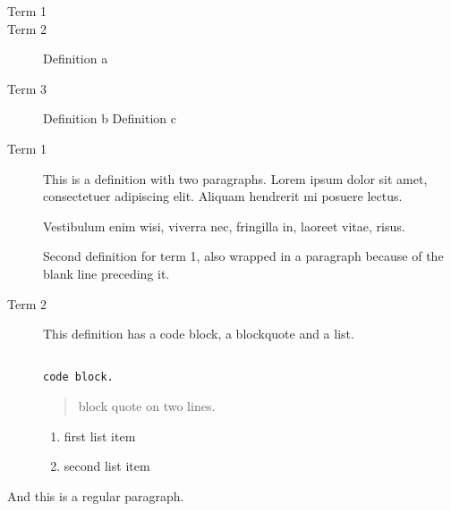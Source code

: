 
\def\mytitle{MultiMarkdown Definition List Test  }

\begin{description}
\item[Term 1
] \item[Term 2
] Definition a\item[Term 3
] 
Definition b
Definition c\item[Term 1
] 

This is a definition with two paragraphs. Lorem ipsum
 dolor sit amet, consectetuer adipiscing elit. Aliquam
 hendrerit mi posuere lectus.

Vestibulum enim wisi, viverra nec, fringilla in, laoreet
vitae, risus.

Second definition for term 1, also wrapped in a paragraph
 because of the blank line preceding it.\item[Term 2
] 

This definition has a code block, a blockquote and a list.

\begin{verbatim}

code block.

\end{verbatim}


\begin{quote}
block quote
on two lines.
\end{quote}
\begin{enumerate}
\item first list item

\item second list item

\end{enumerate}
\end{description}

And this is a regular paragraph.




